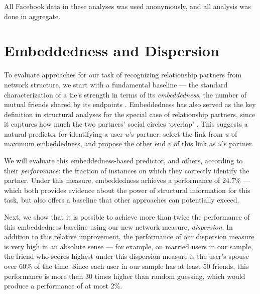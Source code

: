 \documentclass{sigchi}
\begin{document}
All Facebook data in these analyses was used anonymously,
and all analysis was done in aggregate.

\section{Embeddedness and Dispersion}

To evaluate approaches for our task of recognizing relationship partners
from network structure, we start with a fundamental baseline ---
the standard characterization of a tie's strength in terms of its
{\em embeddedness}, the number 
of mutual friends shared by its endpoints
\cite{marsden-tie-strength}.
Embeddedness has also served as the key definition in structural analyses 
for the special case of relationship partners, since it captures how much
the two partners' social circles `overlap'
\cite{felmlee-rel-partner,kalmijn-shared-networks}.
This suggests a natural predictor for identifying a user $u$'s partner:
select the link from $u$ of maximum embeddedness, and propose 
the other end $v$ of this link as $u$'s partner.

We will evaluate this embeddedness-based predictor, and others,
according to their {\em performance}: 
the fraction of instances on which they correctly identify the partner.
Under this measure, embeddedness achieves a performance of $24.7\%$ ---
which both provides evidence about the power of structural information
for this task, but also offers a baseline that other approaches
can potentially exceed.

Next, we show that it is possible
to achieve more than twice the performance of this embeddedness baseline using
our new network measure, {\em dispersion}.
In addition to this relative improvement, 
the performance of our dispersion measure is very high 
in an absolute sense ---
for example, on married users in our sample,
the friend who scores highest under this dispersion
measure is the user's spouse over 60\% of the time.
Since each user in our sample has at least 50 friends, this 
performance is more than 30 times higher than random guessing,
which would produce a performance of at most 2\%.
\end{document}
